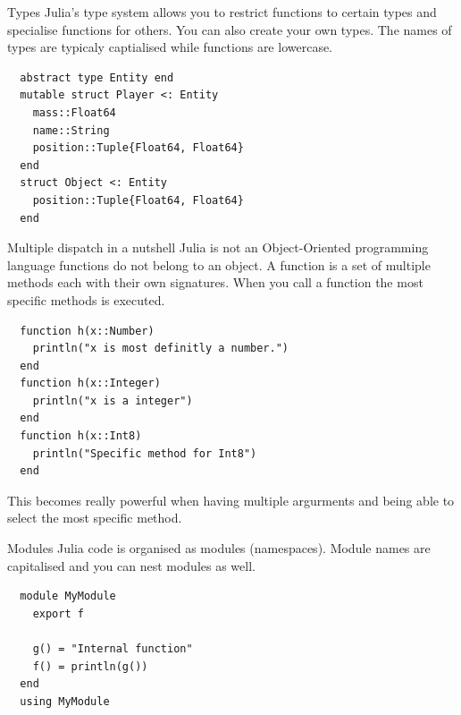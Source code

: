 \documentclass{beamer}
\begin{document}
\begin{frame}[fragile]{Types}
  Julia's type system allows you to restrict functions to certain types and specialise functions for others.
  You can also create your own types. The names of types are typicaly captialised while functions are lowercase.
  \begin{lstlisting}
  abstract type Entity end
  mutable struct Player <: Entity 
    mass::Float64
    name::String
    position::Tuple{Float64, Float64}
  end
  struct Object <: Entity
    position::Tuple{Float64, Float64}
  end
  \end{lstlisting}
\end{frame}
\begin{frame}[fragile]{Multiple dispatch in a nutshell}
  Julia is not an Object-Oriented programming language functions do not belong to an object.
  A function is a set of multiple methods each with their own signatures. When you call a function the most specific methods is executed.

  \begin{lstlisting}
  function h(x::Number)
    println("x is most definitly a number.")
  end
  function h(x::Integer)
    println("x is a integer")
  end
  function h(x::Int8)
    println("Specific method for Int8")
  end
  \end{lstlisting}
  This becomes really powerful when having multiple argurments and being able to select the most specific method.
\end{frame}
\begin{frame}[fragile]{Modules}
  Julia code is organised as modules (namespaces). Module names are capitalised and you can nest modules as well.

  \begin{lstlisting}
  module MyModule
    export f

    g() = "Internal function"
    f() = println(g())
  end
  using MyModule
  \end{lstlisting}
\end{frame}
\end{document}
